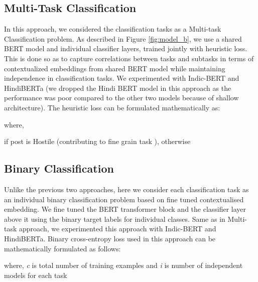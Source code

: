 \documentclass[runningheads]{llncs}
\begin{document}
\subsection{Multi-Task Classification}
{In this approach, we considered the classification tasks as a Multi-task Classification problem. As described in Figure \ref{fig:model_b}, we use a shared BERT model and individual classifier layers, trained jointly with heuristic loss. This is done so as to capture correlations between tasks and subtasks in terms of contextualized embeddings from shared BERT model while maintaining independence in classification tasks. We experimented with Indic-BERT and HindiBERTa (we dropped the Hindi BERT model in this approach as the performance was poor compared to the other two models because of shallow architecture). The heuristic loss can be formulated mathematically as:


where,  



if  post is Hostile  (contributing to fine grain task ),  otherwise 
}

\subsection{Binary Classification}
{Unlike the previous two approaches, here we consider each classification task as an individual binary classification problem based on fine tuned contextualised embedding. We fine tuned the BERT transformer block and the classifier layer above it using the binary target labels for individual classes. Same as in Multi-task approach, we experimented this approach with Indic-BERT and HindiBERTa. Binary cross-entropy loss used in this approach can be mathematically formulated as follows:
 


where, \textit{c} is total number of training examples and \textit{i} is number of independent models for each task
}
\end{document}
